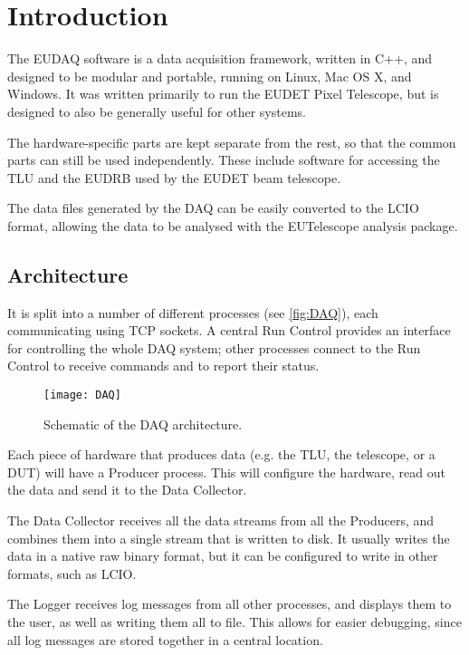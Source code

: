 \section{Introduction}
The EUDAQ software is a data acquisition framework, written in C++,
and designed to be modular and portable, running on Linux, Mac OS X, and Windows.
It was written primarily to run the EUDET Pixel Telescope\cite{Roloff:2009zza},
but is designed to also be generally useful for other systems.

The hardware-specific parts are kept separate from the rest,
so that the common parts can still be used independently.
These include software for accessing the \gls{TLU} and the \gls{EUDRB} used by the EUDET beam telescope.

The data files generated by the DAQ can be easily converted to the \gls{LCIO} format,
allowing the data to be analysed with the EUTelescope\cite{eutel2008} analysis package.

\subsection{Architecture}
It is split into a number of different processes (see \autoref{fig:DAQ}),
each communicating using TCP sockets.
A central Run Control provides an interface for controlling the whole DAQ system;
other processes connect to the Run Control to receive commands and to report their status.

\begin{figure}[htb]
  \begin{center}
    \texttt{[image: DAQ]}
    \caption{Schematic of the DAQ architecture.}
    \label{fig:DAQ}
  \end{center}
\end{figure}

Each piece of hardware that produces data (e.g. the \gls{TLU}, the telescope, or a \gls{DUT}) will have a Producer process.
This will configure the hardware, read out the data and send it to the Data Collector.

The Data Collector receives all the data streams from all the Producers,
and combines them into a single stream that is written to disk.
It usually writes the data in a native raw binary format,
but it can be configured to write in other formats, such as \gls{LCIO}.

The Logger receives log messages from all other processes,
and displays them to the user, as well as writing them all to file.
This allows for easier debugging, since all log messages are stored together in a central location.

